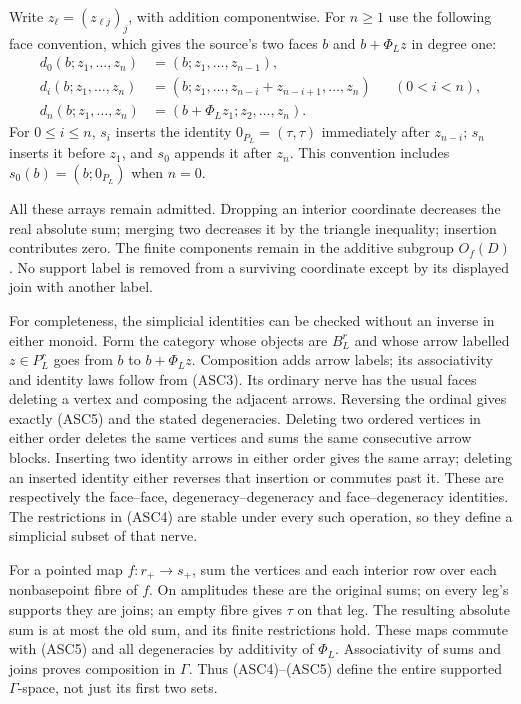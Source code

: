 Write $z_\ell=(z_{\ell j})_j$, with addition componentwise.
For $n\ge1$ use the following face convention, which gives the
source's two faces $b$ and $b+\Phi_Lz$ in degree one:
\begin{equation}\tag{ASC5}
\begin{aligned}
d_0(b;z_1,\ldots,z_n)&=(b;z_1,\ldots,z_{n-1}),\\
d_i(b;z_1,\ldots,z_n)
 &=(b;z_1,\ldots,z_{n-i}+z_{n-i+1},\ldots,z_n)
                 &&(0<i<n),\\
d_n(b;z_1,\ldots,z_n)&=(b+\Phi_Lz_1;z_2,\ldots,z_n).
\end{aligned}
\end{equation}
For $0\le i\le n$, $s_i$ inserts the identity
$0_{P_L}=(\tau,\tau)$ immediately after $z_{n-i}$; $s_n$
inserts it before $z_1$, and $s_0$ appends it after $z_n$.
This convention includes $s_0(b)=(b;0_{P_L})$ when $n=0$.

All these arrays remain admitted. Dropping an interior coordinate
decreases the real absolute sum; merging two decreases it by the
triangle inequality; insertion contributes zero. The finite
components remain in the additive subgroup $O_f(D)$. No support
label is removed from a surviving coordinate except by its displayed
join with another label.

For completeness, the simplicial identities can be checked without
an inverse in either monoid. Form the category whose objects are
$B_L^r$ and whose arrow labelled $z\in P_L^r$ goes from $b$ to
$b+\Phi_Lz$. Composition adds arrow labels; its associativity and
identity laws follow from (ASC3). Its ordinary nerve has the usual
faces deleting a vertex and composing the adjacent arrows.
Reversing the ordinal gives exactly (ASC5) and the stated
degeneracies. Deleting two ordered vertices in either order deletes
the same vertices and sums the same consecutive arrow blocks.
Inserting two identity arrows in either order gives the same array;
deleting an inserted identity either reverses that insertion or
commutes past it. These are respectively the face--face,
degeneracy--degeneracy and face--degeneracy identities.
The restrictions in (ASC4) are stable under every such operation,
so they define a simplicial subset of that nerve.

For a pointed map $f:r_+\to s_+$, sum the vertices and each
interior row over each nonbasepoint fibre of $f$. On amplitudes
these are the original sums; on every leg's supports they are
joins; an empty fibre gives $\tau$ on that leg. The resulting
absolute sum is at most the old sum, and its finite restrictions
hold. These maps commute with (ASC5) and all degeneracies by
additivity of $\Phi_L$. Associativity of sums and joins proves
composition in $\Gamma$. Thus (ASC4)--(ASC5) define the entire
supported $\Gamma$-space, not just its first two sets.

